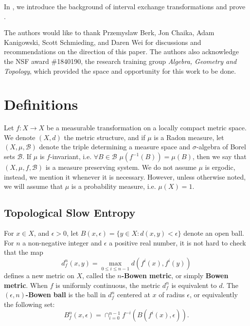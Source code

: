 \documentclass[oneside]{amsart}
\theoremstyle{plain}
\theoremstyle{definition}
\newcommand{\<}{\langle}
\renewcommand{\>}{\rangle}
\newcommand{\B}{\mathcal{B}}
\newcommand{\e}{\epsilon}
\renewcommand{\|}{|\!|} %
\begin{document}
In , we introduce the background of interval exchange transformations and prove .


\vspace{.3cm}

 The authors would like to thank Przemyslaw Berk, Jon Chaika, Adam Kanigowski, Scott Schmieding, and Daren Wei for discussions and recommendations on the direction of this paper. The authors also acknowledge the NSF award {\#}1840190, the research training group {\it Algebra, Geometry and Topology}, which provided the space and opportunity for this work to be done.%
 




\section{Definitions}
\label{sec:defs}
Let $f\colon X \to X$ be a measurable transformation on a locally compact metric space.
We denote $(X,d)$ the metric structure, and if $\mu$ is a Radon measure, let $(X,\mu,\B)$ denote the triple determining a measure space and $\sigma$-algebra of Borel sets $\B$. If $\mu$ is $f$-invariant, i.e. $\forall B \in \B$ $\mu(f^{-1}(B))=\mu(B)$, then we say that $(X,\mu,f,\B)$ is a measure preserving system.
We do not assume $\mu$ is ergodic, instead, we mention it whenever it is necessary. However, unless otherwise noted, we will assume that $\mu$ is a probability measure, i.e. $\mu(X) = 1$.

\subsection{Topological Slow Entropy}
\label{sec:top-slow}
For $x \in X$, and $\e > 0$, let $B(x,\e)=\{y \in X: d(x,y)<\e\}$ denote an open ball. For $n$ a non-negative integer and $\e$ a positive real number, it is not hard to check that the map 
\begin{equation*}
    d^n_f(x,y) = \max_{0\le i \le n-1}d (f^i(x), f^i(y))
\end{equation*}
defines a new metric on $X$, called the \textbf{$n$-Bowen metric}, or simply \textbf{Bowen metric}. When $f$ is uniformly continuous, the metric $d_f^n$ is equivalent to $d$. The $(\e,n)${\bf-Bowen ball} is the ball in $d_f^n$ centered at $x$ of radius $\e$, or equivalently the following set:
\begin{equation*}
    B^n_f(x,\e) = \cap_{i=0}^{n-1} f^{-i}\left( B(f^i(x),\e) \right).
\end{equation*}
\end{document}
